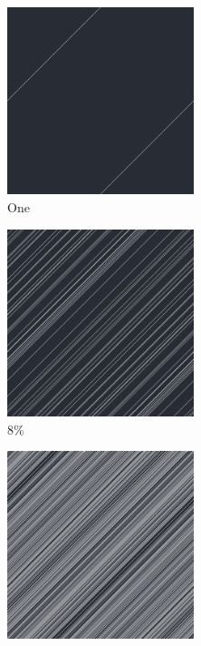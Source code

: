 \documentclass[12pt, fleqn]{report}                             %
\theoremstyle{break}                                            %
\begin{document}
      \begin{figure}[ht!]
        \centering
        \begin{subfigure}[b]{0.4\linewidth}
          \includegraphics[width=0.6\textwidth]{Images/162/a.png}
          \caption{One}
        \end{subfigure}
        \begin{subfigure}[b]{0.4\linewidth}
          \includegraphics[width=0.6\textwidth]{Images/162/b.png}
          \caption{8\%}
        \end{subfigure}
        \begin{subfigure}[b]{0.4\linewidth}
          \includegraphics[width=0.6\textwidth]{Images/162/c.png}

\end{subfigure}
\end{figure}
\end{document}
